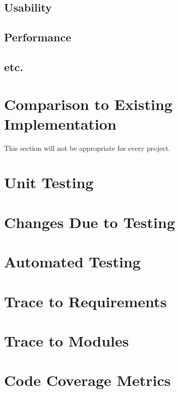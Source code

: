 \documentclass[12pt, titlepage]{article}
\begin{document}
\subsection{Usability}
		
\subsection{Performance}

\subsection{etc.}
	
\section{Comparison to Existing Implementation}	

This section will not be appropriate for every project.

\section{Unit Testing}

\section{Changes Due to Testing}

\section{Automated Testing}
		
\section{Trace to Requirements}
		
\section{Trace to Modules}		

\section{Code Coverage Metrics}




\end{document}
